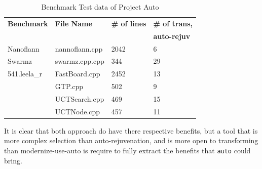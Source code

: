 \documentclass[bsc,frontabs,singlespacing,parskip,deptreport]{infthesis}
\begin{document}


\begin{table}[H]
    \begin{center}
        \begin{tabular}{| l | l | l | l |}
            \hline
            \textbf{Benchmark}    & \textbf{File Name}    & \textbf{\# of lines}  & \textbf{\# of trans,} \\
                                  &                       &                       & \textbf{auto-rejuv}   \\ \hline
            Nanoflann    & nannoflann.cpp   & 2042  & 6  \\ \hline
            Swarmz       & swarmz.cpp.cpp   & 344   & 29 \\ \hline
            541.leela\_r & FastBoard.cpp    & 2452	& 13 \\ \hline
                         & GTP.cpp          & 502	& 9  \\ \hline
                         & UCTSearch.cpp    & 469   & 15 \\ \hline
                         & UCTNode.cpp	    & 457   & 11 \\ \hline
        \end{tabular}
        \caption{Benchmark Test data of Project Auto }
        \label{tab:auto-tool-benchmark-type-limit}
    \end{center}
\end{table}

It is clear that both approach do have there respective benefits, but a tool that is more complex selection than auto-rejuvenation, and is more open to transforming than modernize-use-auto is require to fully extract the benefits that \texttt{auto} could bring.

\end{document}

